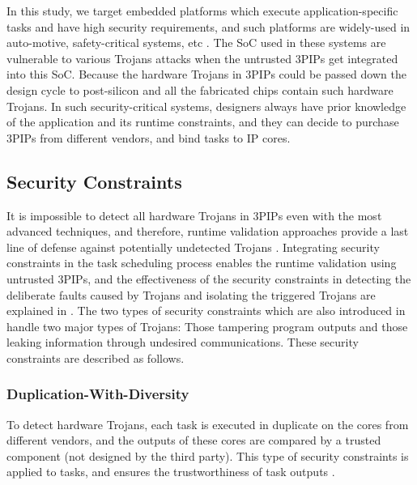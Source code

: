 \documentclass[10pt,journal, compsoc]{IEEEtran}
\begin{document}
In this study, we target embedded platforms which execute application-specific tasks and have high security requirements, and such platforms are widely-used in auto-motive, safety-critical systems, etc \cite{article:YS}. The SoC used in these systems are vulnerable to various Trojans attacks when the untrusted 3PIPs get integrated into this SoC. Because the hardware Trojans in 3PIPs could be passed down the design cycle to post-silicon and all the fabricated chips contain such hardware Trojans. In such security-critical systems, designers always have prior knowledge of the application and its runtime constraints, and they can decide to purchase 3PIPs from different vendors, and bind tasks to IP cores.

\subsection{Security Constraints}

It is impossible to detect all hardware Trojans in 3PIPs even with the most advanced techniques, and therefore, runtime validation approaches provide a last line of defense against  potentially undetected Trojans \cite{article:SB}. Integrating security constraints in the task scheduling process enables the runtime validation using untrusted 3PIPs, and the effectiveness of the security constraints in detecting the deliberate faults caused by Trojans and isolating the triggered Trojans are explained in \cite{article:JR3}. The two types of security constraints which are also introduced in \cite{conference:JR2, article:SR, conference:AS, article:YS, article:XC, article:CL, article:NW, conference:NW} handle two major types of Trojans: Those tampering program outputs and those leaking information through undesired communications. These security constraints are described as follows.%


\subsubsection{Duplication-With-Diversity}

To detect hardware Trojans, each task is executed in duplicate on the cores from different vendors, and the outputs of these cores are compared by a trusted component (not designed by the third party). This type of security constraints is applied to tasks, and ensures the trustworthiness of task outputs \cite{conference:DG}.
\end{document}
